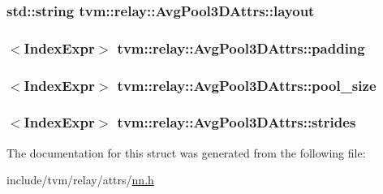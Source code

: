 \subsubsection[{\texorpdfstring{layout}{layout}}]{\setlength{\rightskip}{0pt plus 5cm}std\+::string tvm\+::relay\+::\+Avg\+Pool3\+D\+Attrs\+::layout}\hypertarget{structtvm_1_1relay_1_1AvgPool3DAttrs_ad1e17819d80be259bbe9e1ba7a555f45}{}\label{structtvm_1_1relay_1_1AvgPool3DAttrs_ad1e17819d80be259bbe9e1ba7a555f45}
\subsubsection[{\texorpdfstring{padding}{padding}}]{$<${\bf Index\+Expr}$>$ tvm\+::relay\+::\+Avg\+Pool3\+D\+Attrs\+::padding}\hypertarget{structtvm_1_1relay_1_1AvgPool3DAttrs_a629605080942e97dc4038d2734a567e6}{}\label{structtvm_1_1relay_1_1AvgPool3DAttrs_a629605080942e97dc4038d2734a567e6}
\subsubsection[{\texorpdfstring{pool\+\_\+size}{pool_size}}]{$<${\bf Index\+Expr}$>$ tvm\+::relay\+::\+Avg\+Pool3\+D\+Attrs\+::pool\+\_\+size}\hypertarget{structtvm_1_1relay_1_1AvgPool3DAttrs_a1bb7f4c5299fcea1a2ed28ce770018a3}{}\label{structtvm_1_1relay_1_1AvgPool3DAttrs_a1bb7f4c5299fcea1a2ed28ce770018a3}
\subsubsection[{\texorpdfstring{strides}{strides}}]{$<${\bf Index\+Expr}$>$ tvm\+::relay\+::\+Avg\+Pool3\+D\+Attrs\+::strides}\hypertarget{structtvm_1_1relay_1_1AvgPool3DAttrs_a10d2de4e2d1d5979d8d6b9c6f7ef9757}{}\label{structtvm_1_1relay_1_1AvgPool3DAttrs_a10d2de4e2d1d5979d8d6b9c6f7ef9757}


The documentation for this struct was generated from the following file\+:\begin{DoxyCompactItemize}
\item 
include/tvm/relay/attrs/\hyperlink{include_2tvm_2relay_2attrs_2nn_8h}{nn.\+h}\end{DoxyCompactItemize}

